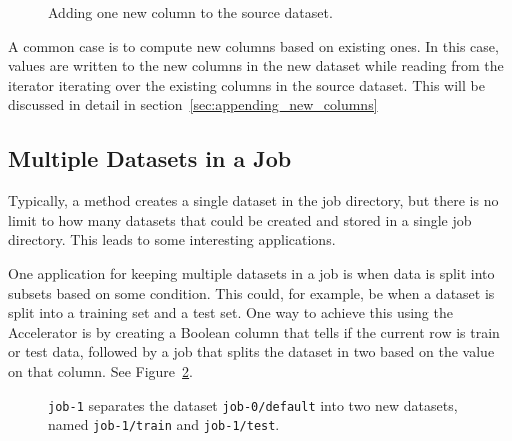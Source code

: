 \begin{figure}[h!]
  \begin{center}
    
    \caption{Adding one new column to the source dataset.}
    \label{fig:dep_dataset_append_column}
  \end{center}
\end{figure}

A common case is to compute new columns based on existing ones.  In
this case, values are written to the new columns in the new dataset
while reading from the iterator iterating over the existing columns in
the source dataset.  This will be discussed in detail in
section~\ref{sec:appending_new_columns}



\subsection{Multiple Datasets in a Job}

Typically, a method creates a single dataset in the job directory, but
there is no limit to how many datasets that could be created and
stored in a single job directory.  This leads to some interesting
applications.

One application for keeping multiple datasets in a job is when data is
split into subsets based on some condition.  This could, for example,
be when a dataset is split into a training set and a test set.  One
way to achieve this using the Accelerator is by creating a Boolean
column that tells if the current row is train or test data, followed
by a job that splits the dataset in two based on the value on that
column.  See Figure~\ref{fig:dep_dataset_csvimport_chain}.

\begin{figure}[h!]
  \hspace{1cm}
  
  \caption{\texttt{job-1} separates the dataset
    \texttt{job-0/default} into two new datasets, named
    \texttt{job-1/train} and \texttt{job-1/test}.}
  \label{fig:dep_dataset_csvimport_chain}
\end{figure}



